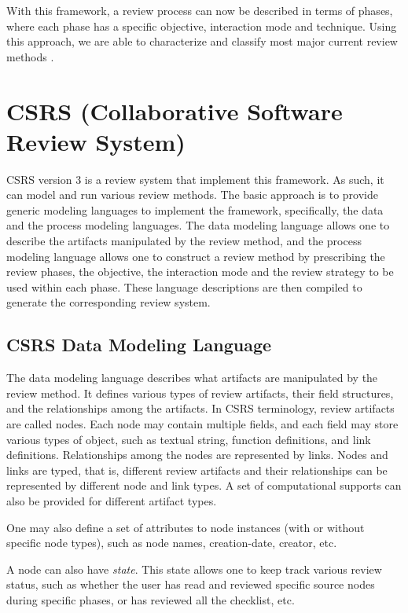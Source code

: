 With this framework, a review process can now be described in terms
of phases, where each phase has a specific objective, interaction mode
and technique. Using this approach, we are able to characterize and
classify most major current review methods \cite{Tjahjono94}.

\section {CSRS (Collaborative Software Review System)}

CSRS version 3 is a review system that implement this framework. As
such, it can model and run various review methods. The basic approach
is to provide generic modeling languages to implement the framework,
specifically, the data and the process modeling languages.
The data modeling language allows one to describe the artifacts
manipulated by the review method, and the process modeling language
allows one to construct a review method by 
prescribing the review phases, the objective, the interaction mode and
the review strategy to be used within each phase.
These language descriptions are then compiled to generate the
corresponding review system. 


\subsection{CSRS Data Modeling Language}

The data modeling language describes what artifacts are manipulated by
the review method. It defines various types of review
artifacts, their field structures, and the relationships among the
artifacts. In CSRS terminology, review artifacts are called nodes.
Each node may contain multiple fields, and each field may store
various types of object, such as 
textual string, function definitions, and link definitions.
Relationships among the nodes are represented by links.   
Nodes and links are typed, that is, different review artifacts and
their relationships can be represented by different node and link types. 
A set of computational supports can also be provided for different
artifact types.

One may also define a set of attributes to node instances (with or
without specific node types), such as node names, creation-date,
creator, etc. 

A node can also have {\it state}. This state allows one to
keep track various review status, such as whether the user has read
and reviewed specific source nodes during specific phases, or has
reviewed all the checklist, etc.

